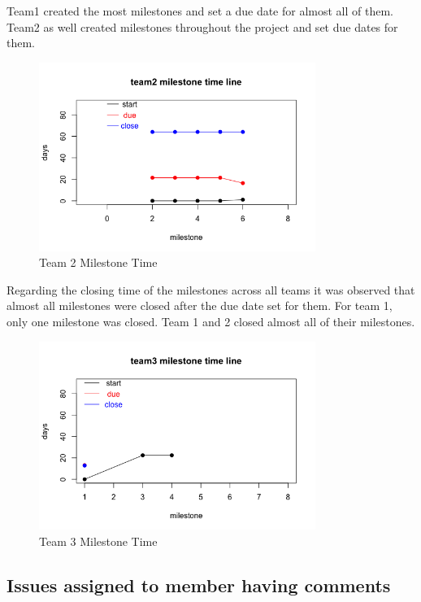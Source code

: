 \documentclass[conference]{IEEEtran}
\begin{document}
Team1 created the most milestones and set a due date for almost all of them. Team2 as well created milestones throughout the project and set due dates for them.



\begin{figure}[H]
    \centering
    \includegraphics[width=9cm]{../AprilProject/pic/team2_milestone_time.png}
    \caption{Team 2 Milestone Time}
    \label{team2_milestone_time}
\end{figure}


Regarding the closing time of the milestones across all teams it was observed that almost all milestones were closed after the due date set for them. For team 1, only one milestone was closed. Team 1 and 2 closed almost all of their milestones.

\begin{figure}[H]
    \centering
    \includegraphics[width=9cm]{../AprilProject/pic/team3_milestone_time.png}
    \caption{Team 3 Milestone Time}
    \label{team3_milestone_time}
\end{figure}


\subsection{Issues assigned to member having comments}
\end{document}
